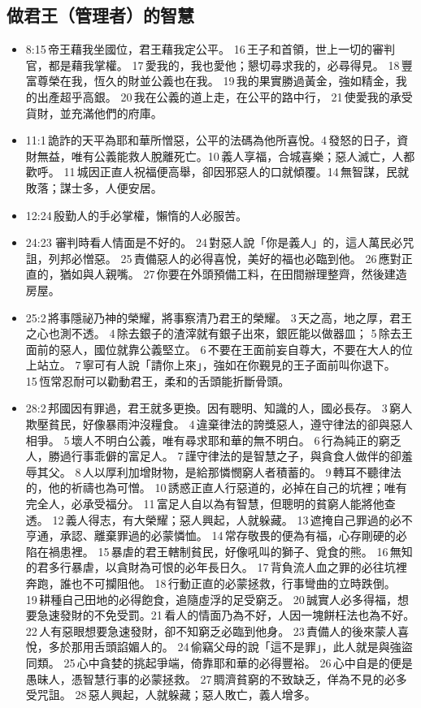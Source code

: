 \subsection{做君王（管理者）的智慧}
\begin{itemize}
\itemsep-.45em 
\item  8:15 帝王藉我坐國位，君王藉我定公平。 16 王子和首領，世上一切的審判官，都是藉我掌權。 17 愛我的，我也愛他；懇切尋求我的，必尋得見。 18 豐富尊榮在我，恆久的財並公義也在我。 19 我的果實勝過黃金，強如精金，我的出產超乎高銀。 20 我在公義的道上走，在公平的路中行， 21 使愛我的承受貨財，並充滿他們的府庫。
\item  11:1 詭詐的天平為耶和華所憎惡，公平的法碼為他所喜悅。4 發怒的日子，資財無益，唯有公義能救人脫離死亡。10 義人享福，合城喜樂；惡人滅亡，人都歡呼。 11 城因正直人祝福便高舉，卻因邪惡人的口就傾覆。14 無智謀，民就敗落；謀士多，人便安居。
\item  12:24 殷勤人的手必掌權，懶惰的人必服苦。
\item  24:23 審判時看人情面是不好的。 24 對惡人說「你是義人」的，這人萬民必咒詛，列邦必憎惡。 25 責備惡人的必得喜悅，美好的福也必臨到他。 26 應對正直的，猶如與人親嘴。 27 你要在外頭預備工料，在田間辦理整齊，然後建造房屋。
\item  25:2 將事隱祕乃神的榮耀，將事察清乃君王的榮耀。 3 天之高，地之厚，君王之心也測不透。 4 除去銀子的渣滓就有銀子出來，銀匠能以做器皿； 5 除去王面前的惡人，國位就靠公義堅立。 6 不要在王面前妄自尊大，不要在大人的位上站立。 7 寧可有人說「請你上來」，強如在你覲見的王子面前叫你退下。15 恆常忍耐可以勸動君王，柔和的舌頭能折斷骨頭。
\item  28:2 邦國因有罪過，君王就多更換。因有聰明、知識的人，國必長存。 3 窮人欺壓貧民，好像暴雨沖沒糧食。 4 違棄律法的誇獎惡人，遵守律法的卻與惡人相爭。 5 壞人不明白公義，唯有尋求耶和華的無不明白。 6 行為純正的窮乏人，勝過行事乖僻的富足人。 7 謹守律法的是智慧之子，與貪食人做伴的卻羞辱其父。 8 人以厚利加增財物，是給那憐憫窮人者積蓄的。 9 轉耳不聽律法的，他的祈禱也為可憎。 10 誘惑正直人行惡道的，必掉在自己的坑裡；唯有完全人，必承受福分。 11 富足人自以為有智慧，但聰明的貧窮人能將他查透。 12 義人得志，有大榮耀；惡人興起，人就躲藏。 13 遮掩自己罪過的必不亨通，承認、離棄罪過的必蒙憐恤。 14 常存敬畏的便為有福，心存剛硬的必陷在禍患裡。 15 暴虐的君王轄制貧民，好像吼叫的獅子、覓食的熊。 16 無知的君多行暴虐，以貪財為可恨的必年長日久。 17 背負流人血之罪的必往坑裡奔跑，誰也不可攔阻他。 18 行動正直的必蒙拯救，行事彎曲的立時跌倒。19 耕種自己田地的必得飽食，追隨虛浮的足受窮乏。 20 誠實人必多得福，想要急速發財的不免受罰。21 看人的情面乃為不好，人因一塊餅枉法也為不好。22 人有惡眼想要急速發財，卻不知窮乏必臨到他身。 23 責備人的後來蒙人喜悅，多於那用舌頭諂媚人的。 24 偷竊父母的說「這不是罪」，此人就是與強盜同類。 25 心中貪婪的挑起爭端，倚靠耶和華的必得豐裕。 26 心中自是的便是愚昧人，憑智慧行事的必蒙拯救。 27 賙濟貧窮的不致缺乏，佯為不見的必多受咒詛。 28 惡人興起，人就躲藏；惡人敗亡，義人增多。

\end{itemize}
